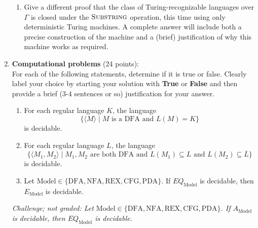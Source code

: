 \begin{enumerate}
\begin{enumerate}
    \item\gradeComplete Give a different proof that the class of Turing-recognizable 
    languages over $\Gamma$ is closed 
    under the $\textsc{Substring}$ operation, this time using only deterministic Turing machines.  A complete answer will 
    include both a precise construction of the machine and a 
    (brief) justification of why this machine works as required.

\end{enumerate}


\item \textbf{Computational problems} (24 points): \\
For each of the following statements, determine if it is true or false. 
Clearly label your choice 
by starting your solution with {\bf True} or {\bf False} and then
provide a brief (3-4 sentences or so) justification for your answer.

\begin{enumerate}
\item\gradeCorrect For each regular language $K$, the language 
\[
\{ \langle M \rangle \mid M \text{ is a DFA and } L(M) = K\} 
\]
is decidable.

\item\gradeCorrect For each regular language $L$, the language
\[
\{ \langle M_1, M_2 \rangle \mid M_1, M_2\text{ are both DFA and } 
L(M_1) \subseteq L \text{ and } L(M_2) \subseteq \overline{L}\}
\]
is decidable.


\item\gradeCorrect Let $\mathrm{Model} \in \{\mathrm{DFA}, \mathrm{NFA}, 
\mathrm{REX}, \mathrm{CFG}, \mathrm{PDA} \}$. If $EQ_{\mathrm{Model}}$ is decidable, 
then $E_{\mathrm{Model}}$ is decidable.

\end{enumerate}

{\it Challenge; not graded: Let $\mathrm{Model} \in \{\mathrm{DFA}, \mathrm{NFA}, 
\mathrm{REX}, \mathrm{CFG}, \mathrm{PDA} \}$. If $A_{\mathrm{Model}}$ is decidable, 
then $EQ_{\mathrm{Model}}$ is decidable.}

\end{enumerate}

\newpage
\titleformat{\subsubsection}[runin]
   {\normalfont\bfseries}{}{}{}
   
